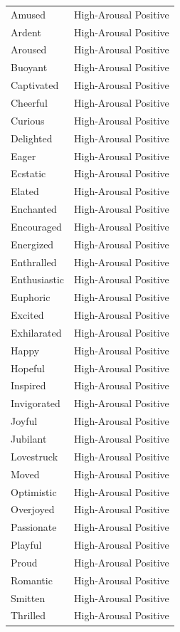 \begin{longtable}{p{}p{}}
Amused & High-Arousal Positive \\
Ardent & High-Arousal Positive \\
Aroused & High-Arousal Positive \\
Buoyant & High-Arousal Positive \\
Captivated & High-Arousal Positive \\
Cheerful & High-Arousal Positive \\
Curious & High-Arousal Positive \\
Delighted & High-Arousal Positive \\
Eager & High-Arousal Positive \\
Ecstatic & High-Arousal Positive \\
Elated & High-Arousal Positive \\
Enchanted & High-Arousal Positive \\
Encouraged & High-Arousal Positive \\
Energized & High-Arousal Positive \\
Enthralled & High-Arousal Positive \\
Enthusiastic & High-Arousal Positive \\
Euphoric & High-Arousal Positive \\
Excited & High-Arousal Positive \\
Exhilarated & High-Arousal Positive \\
Happy & High-Arousal Positive \\
Hopeful & High-Arousal Positive \\
Inspired & High-Arousal Positive \\
Invigorated & High-Arousal Positive \\
Joyful & High-Arousal Positive \\
Jubilant & High-Arousal Positive \\
Lovestruck & High-Arousal Positive \\
Moved & High-Arousal Positive \\
Optimistic & High-Arousal Positive \\
Overjoyed & High-Arousal Positive \\
Passionate & High-Arousal Positive \\
Playful & High-Arousal Positive \\
Proud & High-Arousal Positive \\
Romantic & High-Arousal Positive \\
Smitten & High-Arousal Positive \\
Thrilled & High-Arousal Positive \\

\end{longtable}
